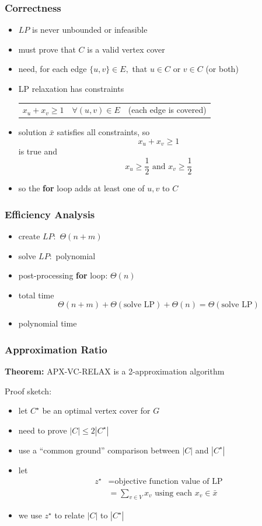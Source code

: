 \documentclass{beamer}
\begin{document}
\begin{frame} \frametitle{Correctness}
\begin{itemize}
  \item $LP$ is never unbounded or infeasible
  \item must prove that $C$ is a valid vertex cover
  \item need, for each edge $\{u, v\} \in E,$ that $u \in C$ or $v \in C$ (or both)
  \item LP relaxation has constraints
    \begin{tabular}{lll}
      $x_u + x_v \geq 1$ & $\forall (u, v) \in E$ & (each edge is covered)
    \end{tabular}
  \item solution $\bar{x}$ satisfies all constraints, so
    \[  x_u + x_v \geq 1 \]
    is true and
    \[ x_u \geq \frac{1}{2} \text{ and } x_v \geq \frac{1}{2} \]
  \item so the \textbf{for} loop adds at least one of $u, v$ to $C$
\end{itemize}
\end{frame}

\begin{frame} \frametitle{Efficiency Analysis}
  \begin{itemize}
    \item create $LP:$ $\Theta(n+m)$
    \item solve $LP:$ polynomial
    \item post-processing \textbf{for} loop: $\Theta(n)$
    \item total time
      \[ \Theta(n+m) + \Theta(\text{solve LP}) + \Theta(n) = \Theta(\text{solve LP}) \]
    \item polynomial time
  \end{itemize}
\end{frame}

\begin{frame} \frametitle{Approximation Ratio}
  \textbf{Theorem:} APX-VC-RELAX is a 2-approximation algorithm

  Proof sketch:
  \begin{itemize}
    \item let $C^\star$ be an optimal vertex cover for $G$
    \item need to prove $|C| \leq 2 |C^\star|$
    \item use a ``common ground'' comparison between $|C|$ and $|C^\star|$
    \item let
      \begin{align*}
        z^\star &= \text{objective function value of LP} \\
        &= \sum_{v \in V} x_v \text{ using each } x_v \in \bar{x}
      \end{align*}
    \item we use $z^\star$ to relate $|C|$ to $|C^\star|$
  \end{itemize}
\end{frame}
\end{document}
